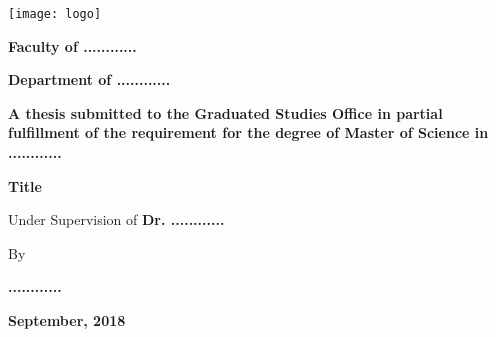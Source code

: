 \thispagestyle{empty}

\begin{center}
	\texttt{[image: logo]}
	
	\vspace{5mm}
	
	\large \textbf{Faculty of ............}
	
	\vspace{5mm}
	
	\large \textbf{Department of ............}
	
	\vspace{5mm}
	
	\large \textbf{A thesis submitted to the Graduated Studies Office in partial fulfillment of the requirement for the degree of Master of Science in ............}
	
	\vspace{15mm}
	
	\huge \textbf{Title}
	
	\vspace{15mm}
	
	\large Under Supervision of \textbf{Dr. ............}
	
	\vspace{15mm}
	
	\large By
	
	\vspace{2mm}
	
	\large \textbf{............}
	
	\vspace{20mm}
	
	\large \textbf{September, 2018}
\end{center}
